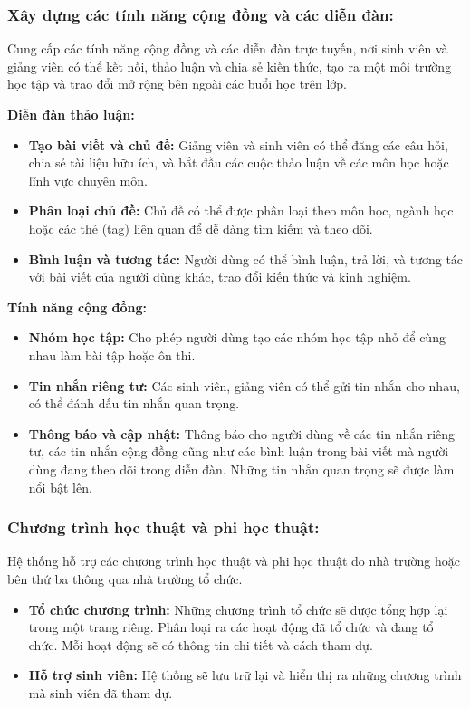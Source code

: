 \documentclass[a4paper, 15pt]{article}
\begin{document}
\subsubsection{Xây dựng các tính năng cộng đồng và các diễn đàn:}
Cung cấp các tính năng cộng đồng và các diễn đàn trực tuyến, nơi sinh viên và giảng viên có thể kết nối, thảo luận và chia sẻ kiến thức, tạo ra một môi trường học tập và trao đổi mở rộng bên ngoài các buổi học trên lớp. 

\textbf{Diễn đàn thảo luận:}
\begin{itemize}
    \item \textbf{Tạo bài viết và chủ đề:}
    Giảng viên và sinh viên có thể đăng các câu hỏi, chia sẻ tài liệu hữu ích, và bắt đầu các cuộc thảo luận về các môn học hoặc lĩnh vực chuyên môn.
    
    \item \textbf{Phân loại chủ đề:}
    Chủ đề có thể được phân loại theo môn học, ngành học hoặc các thẻ (tag) liên quan để dễ dàng tìm kiếm và theo dõi.

    \item \textbf{Bình luận và tương tác:}
    Người dùng có thể bình luận, trả lời, và tương tác với bài viết của người dùng khác, trao đổi kiến thức và kinh nghiệm.
\end{itemize}

\textbf{Tính năng cộng đồng:}
\begin{itemize}
    \item \textbf{Nhóm học tập:}
    Cho phép người dùng tạo các nhóm học tập nhỏ để cùng nhau làm bài tập hoặc ôn thi.

    \item \textbf{Tin nhắn riêng tư:}
    Các sinh viên, giảng viên có thể gửi tin nhắn cho nhau, có thể đánh dấu tin nhắn quan trọng.

    \item \textbf{Thông báo và cập nhật:}
    Thông báo cho người dùng về các tin nhắn riêng tư, các tin nhắn cộng đồng cũng như các bình luận trong bài viết mà người dùng đang theo dõi trong diễn đàn. Những tin nhắn quan trọng sẽ được làm nổi bật lên.
\end{itemize}

\subsubsection{Chương trình học thuật và phi học thuật:}
Hệ thống hỗ trợ các chương trình học thuật và phi học thuật do nhà trường hoặc bên thứ ba thông qua nhà trường tổ chức.
\begin{itemize}
    \item \textbf{Tổ chức chương trình:}
    Những chương trình tổ chức sẽ được tổng hợp lại trong một trang riêng. Phân loại ra các hoạt động đã tổ chức và đang tổ chức. Mỗi hoạt động sẽ có thông tin chi tiết và cách tham dự.

    \item \textbf{Hỗ trợ sinh viên:}
    Hệ thống sẽ lưu trữ lại và hiển thị ra những chương trình mà sinh viên đã tham dự.
\end{itemize}
\end{document}
